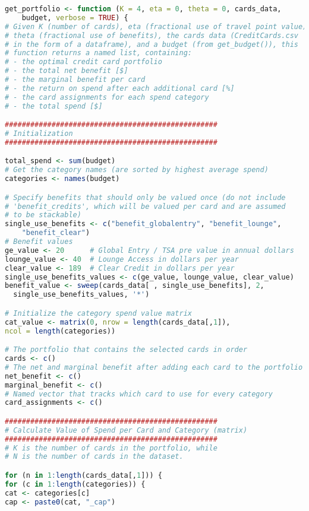 \begin{lstlisting}[language=R]
get_portfolio <- function (K = 4, eta = 0, theta = 0, cards_data, 
    budget, verbose = TRUE) {
# Given K (number of cards), eta (fractional use of travel point value), 
# theta (fractional use of benefits), the cards data (CreditCards.csv
# in the form of a dataframe), and a budget (from get_budget()), this 
# function returns a named list, containing:
# - the optimal credit card portfolio
# - the total net benefit [$]
# - the marginal benefit per card
# - the return on spend after each additional card [%]
# - the card assignments for each spend category
# - the total spend [$]

##################################################
# Initialization
##################################################

total_spend <- sum(budget)
# Get the category names (are sorted by highest average spend)
categories <- names(budget)

# Specify benefits that should only be valued once (do not include
# 'benefit_credits', which will be valued per card and are assumed 
# to be stackable)
single_use_benefits <- c("benefit_globalentry", "benefit_lounge",
    "benefit_clear")
# Benefit values
ge_value <- 20      # Global Entry / TSA pre value in annual dollars
lounge_value <- 40  # Lounge Access in dollars per year
clear_value <- 189  # Clear Credit in dollars per year
single_use_benefits_values <- c(ge_value, lounge_value, clear_value)
benefit_value <- sweep(cards_data[ , single_use_benefits], 2, 
  single_use_benefits_values, '*')

# Initialize the category spend value matrix
cat_value <- matrix(0, nrow = length(cards_data[,1]), 
ncol = length(categories))

# The portfolio that contains the selected cards in order
cards <- c()
# The net and marginal benefit after adding each card to the portfolio
net_benefit <- c()
marginal_benefit <- c()
# Named vector that tracks which card to use for every category
card_assignments <- c()

##################################################
# Calculate Value of Spend per Card and Category (matrix)
##################################################
# K is the number of cards in the portfolio, while 
# N is the number of cards in the dataset.

for (n in 1:length(cards_data[,1])) {
for (c in 1:length(categories)) {
cat <- categories[c]
cap <- paste0(cat, "_cap")


\end{lstlisting}
